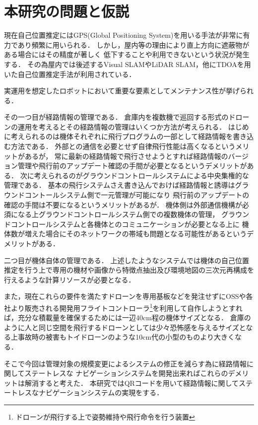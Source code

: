\section{本研究の問題と仮説}
現在自己位置推定にはGPS(Global Positioning System)を用いる手法が非常に有力であり頻繁に用いられる．
しかし，屋内等の理由により直上方向に遮蔽物がある場合にはその精度が著しく
低下することや利用できないという状況が発生する．
その為屋内では後述するVisual SLAMやLiDAR SLAM，他にTDOAを用いた自己位置推定手法が利用されている．

実運用を想定したロボットにおいて重要な要素としてメンテナンス性が挙げられる．

その一つ目が経路情報の管理である．
倉庫内を複数機で巡回する形式のドローンの運用を考えるとその経路情報の管理はいくつか方法が考えられる．
はじめに考えられるのは機体それぞれに飛行プログラムの一部として経路情報を書き込む方法である．
外部との通信を必要とせず自律飛行性能は高くなるというメリットがあるが，
常に最新の経路情報で飛行させようとすれば経路情報のバージョン管理や飛行前のアップデート確認の手間が必要となるというデメリットがある．
次に考えられるのがグラウンドコントロールシステムによる中央集権的な管理である．
基本の飛行システムさえ書き込んでおけば経路情報と誘導はグラウンドコントールシステム側で一元管理が可能になり
飛行前のアップデートの確認の手間は不要になるというメリットがあるが．
機体側は外部通信機構が必須になる上グラウンドコントロールシステム側での複数機体の管理，
グラウンドコントロールシステムと各機体とのコミュニケーションが必要となる上に
機体数が増えた場合にそのネットワークの帯域も問題となる可能性があるというデメリットがある．

二つ目が機体自体の管理である．
上述したようなシステムでは機体の自己位置推定を行う上で専用の機材や画像から特徴点抽出及び環境地図の三次元再構成を行えるような計算リソースが必要となる．

また，現在これらの要件を満たすドローンを専用基板などを発注せずにOSSや各社より販売される開発用フライトコントローラ\footnote{ドローンが飛行する上で姿勢維持や飛行命令を行う装置}を利用して自作しようとすれば，充分な積載量を確保するためには一辺40cm程の機体サイズとなる．
倉庫のように人と同じ空間を飛行するドローンとしては少々恐怖感を与えるサイズとなる上事故時の被害もトイドローンのような10cm代の小型のものより大きくなる．

そこで今回は管理対象の規模変更によるシステムの修正を減らす為に経路情報に関してステートレスな
ナビゲーションシステムを開発出来ればこれらのデメリットは解消すると考えた．
本研究ではQRコードを用いて経路情報に関してステートレスなナビゲーションシステムの実現をする．
